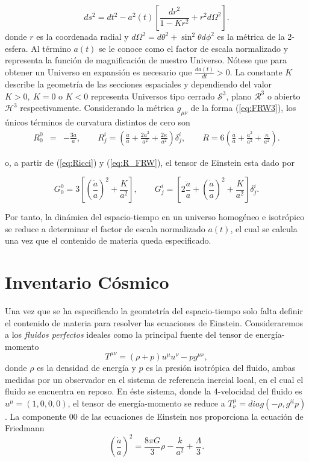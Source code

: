 \documentclass[10.5pt,prb,
               showpacs,            %
               preprintnumbers,     %
               aps,                 %
               prl,          	    %
               letterpaper,             %
               superscriptaddress,      %
               nofootinbib,         %
               tightenlines,        %
               floats,floatfix      %
               ,usenatbib]{revtex4-1}%
\def\beq{\begin{equation}}
\def\eeq{\end{equation}}
\begin{document}
	\beq \label{eq:FRW3}
		ds^2 = dt^2 - a^2(t)\left[\frac{dr^2}{1-Kr^2} + r^2d\Omega^2 \right].
	\eeq
%
donde $r$ es la coordenada radial y $d\Omega^2 = d\theta^2 + \sin^2 \theta d\phi^2$ es la m\'etrica de la 2-esfera. 
Al t\'ermino $a(t)$ se le conoce como el factor de escala normalizado y representa la funci\'on 
de magnificaci\'on de nuestro Universo. N\'otese que para obtener un Universo en expansi\'on 
es necesario que $\frac{d a(t)}{dt}>0$. La constante $K$ describe la geometr\'ia de las secciones espaciales 
y dependiendo del valor $K>0,~ K=0$ o $K<0$
representa Universos tipo cerrado $\mathcal{S}^3$, plano $\mathcal{R}^3$ o abierto $\mathcal{H}^3$  respectivamente.
%
Considerando la m\'etrica $g_{\mu \nu}$ de la forma (\ref{eq:FRW3}), los \'unicos t\'erminos de curvatura distintos de cero son
%
	\begin{eqnarray} \label{eq:R_FRW}
		R^0_0 &=& -\frac{3\ddot a}{a},\label{eq:curvs1}  \qquad
		R^i_j = \left(\frac{\ddot a}{a}+\frac{2\dot a^2}{a^2} +
				  \frac{2\kappa}{a^2} \right)\delta^i_j, \label{eq:R2} \qquad
		R     = 6 \left(\frac{\ddot a}{a} +\frac{\dot a^2}{a^2}+ 
				  \frac{\kappa}{a^2} \right). \label{eq:R3}
	\end{eqnarray}

o,  a partir de (\ref{eq:Ricci}) y (\ref{eq:R_FRW}), el tensor de Einstein esta dado por

	\begin{equation}
		G^0_0 = 3 \left[ \left( \frac{\dot a}{a} \right)^2 + \frac{K}{a^2} \right], \qquad 
				G^i_j =\left[2\frac{\ddot a}{a} + \left( \frac{\dot a}{a} \right)^2  + \frac{K}{a^2}\right]\delta^i_j.
	\end{equation}

Por tanto, la din\'amica del espacio-tiempo en un universo homog\'eneo e isotr\'opico se reduce a determinar
el factor de escala normalizado $a(t)$, el cual se calcula una vez que el contenido de materia queda especificado.


\section{Inventario C\'osmico}


Una vez que se ha especificado la geomtetr\'ia del espacio-tiempo solo falta definir el contenido de materia  
para resolver las ecuaciones de Einstein. 
Consideraremos a los \textit{fluidos perfectos} ideales como la principal fuente del tensor
de energ\'ia-momento
%
	\beq
		T^{\mu \nu} = (\rho + p)u^\mu u^\nu - p g^{\mu \nu},
	\eeq
%
donde $\rho$ es la densidad de energ\'ia y $p$ es la presi\'on isotr\'opica del fluido, ambas
medidas por un observador en el sistema de referencia inercial local, en el cual el fluido
se encuentra en reposo. En \'este sistema, donde la 4-velocidad del fluido es $u^{\mu}=(1,0,0,0)$,
el tensor de energ\'ia-momento se reduce a $T^{\mu}_\nu=diag(-\rho, g^{ii}p)$. 
%
La componente $00$ de las ecuaciones de Einstein nos proporciona la ecuaci\'on de Friedmann
%
	\beq \label{eq:Fried}
		\left(\frac{\dot a}{a}\right)^2 = \frac{8\pi G}{3} \rho - \frac{k}{a^2} + \frac{\Lambda}{3}.
	\eeq
\end{document}
